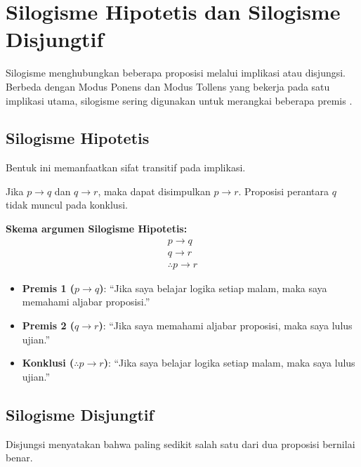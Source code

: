 \section{Silogisme Hipotetis dan Silogisme Disjungtif}

Silogisme menghubungkan beberapa proposisi melalui implikasi atau disjungsi. Berbeda dengan Modus Ponens dan Modus Tollens yang bekerja pada satu implikasi utama, silogisme sering digunakan untuk merangkai beberapa premis \cite{rosen2019}.

\subsection{Silogisme Hipotetis}

Bentuk ini memanfaatkan sifat transitif pada implikasi.

\begin{teorema}
Jika $p \rightarrow q$ dan $q \rightarrow r$, maka dapat disimpulkan $p \rightarrow r$. Proposisi perantara $q$ tidak muncul pada konklusi.
\end{teorema}

\textbf{Skema argumen Silogisme Hipotetis:}
\[
\begin{array}{c}
p \rightarrow q \\
q \rightarrow r \\
\hline
\therefore p \rightarrow r
\end{array}
\]

\begin{contoh}
\begin{itemize}
    \item \textbf{Premis 1 ($p \rightarrow q$)}: ``Jika saya belajar logika setiap malam, maka saya memahami aljabar proposisi.''
    \item \textbf{Premis 2 ($q \rightarrow r$)}: ``Jika saya memahami aljabar proposisi, maka saya lulus ujian.''
    \item \textbf{Konklusi ($\therefore p \rightarrow r$)}: ``Jika saya belajar logika setiap malam, maka saya lulus ujian.''
\end{itemize}
\end{contoh}

\subsection{Silogisme Disjungtif}

Disjungsi menyatakan bahwa paling sedikit salah satu dari dua proposisi bernilai benar.

